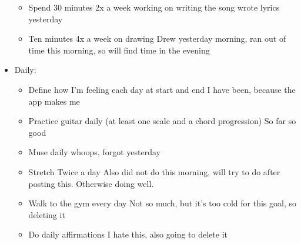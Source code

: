 \documentclass[12pt]{article}[titlepage]
\renewcommand{\,}{\textsuperscript{,}}
\begin{document}
\begin{itemize}
\begin{itemize}
\item Spend 30 minutes 2x a week working on writing the song \-\> wrote lyrics yesterday  
\item Ten minutes 4x a week on drawing \-\> Drew yesterday morning, ran out of time this morning, so will find time in the evening  
\end{itemize}  
\item Daily:  
\begin{itemize}  
\item Define how I'm feeling each day at start and end \-\> I have been, because the app makes me  
\item Practice guitar daily (at least one scale and a chord progression) \-\> So far so good  
\item Muse daily \-\> whoops, forgot yesterday  
\item Stretch Twice a day \-\> Also did not do this morning, will try to do after posting this. Otherwise doing well.  
\item Walk to the gym every day \-\> Not so much, but it's too cold for this goal, so deleting it  
\item Do daily affirmations \-\> I hate this, also going to delete it  
\end{itemize}  
\end{itemize}
\end{document}
